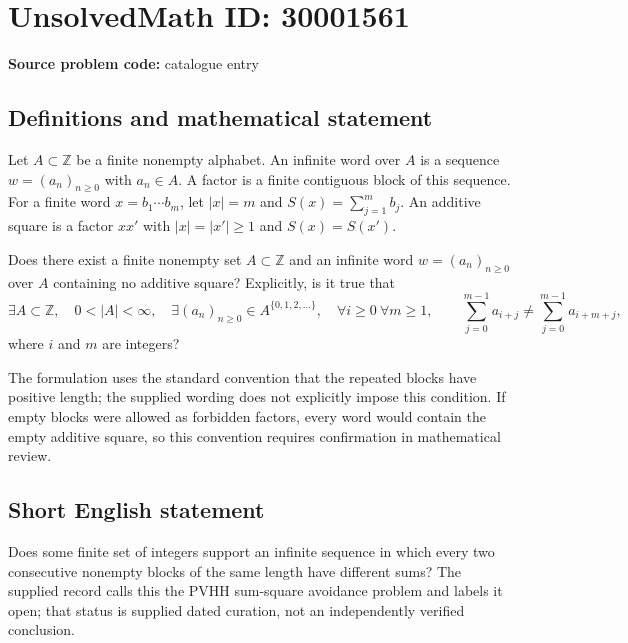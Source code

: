 \documentclass[11pt]{article}
\newcommand{\Z}{\mathbb{Z}}
\begin{document}
\section*{UnsolvedMath ID: 30001561}
\textbf{Source problem code:} catalogue entry
\subsection{Definitions and mathematical statement}
Let \(A\subset\Z\) be a finite nonempty alphabet. An infinite word over \(A\) is a sequence \(w=(a_n)_{n\geq 0}\) with \(a_n\in A\). A factor is a finite contiguous block of this sequence. For a finite word \(x=b_1\cdots b_m\), let \(|x|=m\) and \(S(x)=\sum_{j=1}^{m}b_j\). An additive square is a factor \(xx'\) with \(|x|=|x'|\geq 1\) and \(S(x)=S(x')\).

Does there exist a finite nonempty set \(A\subset\Z\) and an infinite word \(w=(a_n)_{n\geq0}\) over \(A\) containing no additive square? Explicitly, is it true that
\[
\exists A\subset\Z,\quad 0<|A|<\infty,\quad
\exists (a_n)_{n\geq0}\in A^{\{0,1,2,\ldots\}},\quad
\forall i\geq0\ \forall m\geq1,\qquad
\sum_{j=0}^{m-1}a_{i+j}\ne\sum_{j=0}^{m-1}a_{i+m+j},
\]
where \(i\) and \(m\) are integers?

The formulation uses the standard convention that the repeated blocks have positive length; the supplied wording does not explicitly impose this condition. If empty blocks were allowed as forbidden factors, every word would contain the empty additive square, so this convention requires confirmation in mathematical review.
\subsection{Short English statement}
Does some finite set of integers support an infinite sequence in which every two consecutive nonempty blocks of the same length have different sums? The supplied record calls this the PVHH sum-square avoidance problem and labels it open; that status is supplied dated curation, not an independently verified conclusion.
\end{document}
